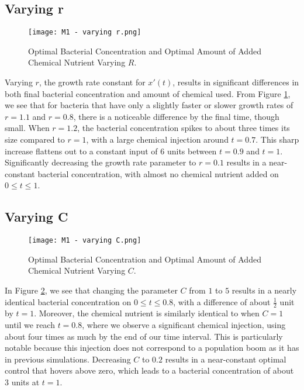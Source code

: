 \documentclass[10pt]{article}
\theoremstyle{exmp}
\begin{document}
\newpage 
\subsection{Varying r}

\begin{figure}[h!tbp]
    \centering
    \texttt{[image: M1 - varying r.png]}
    \caption{Optimal Bacterial Concentration and Optimal Amount of Added Chemical Nutrient Varying $R$.}
    \label{fig:r}
\end{figure}

\noindent Varying $r$, the growth rate constant for $x'(t)$, results in significant differences in both final bacterial concentration and amount of chemical used. From Figure \ref{fig:r}, we see that for bacteria that have only a slightly faster or slower growth rates of $r = 1.1$ and $r = 0.8$, there is a noticeable difference by the final time, though small. When $r = 1.2$, the bacterial concentration spikes to about three times its size compared to $r = 1$, with a large chemical injection around $t = 0.7$. This sharp increase flattens out to a constant input of $6$ units between $t = 0.9$ and $t = 1$. Significantly decreasing the growth rate parameter to $r = 0.1$ results in a near-constant bacterial concentration, with almost no chemical nutrient added on $0 \leq t \leq 1$. \\

\subsection{Varying C}

\begin{figure}
    \centering
    \texttt{[image: M1 - varying C.png]}
    \caption{Optimal Bacterial Concentration and Optimal Amount of Added Chemical Nutrient Varying $C$.}
    \label{fig:C}
\end{figure}

In Figure \ref{fig:C}, we see that changing the parameter $C$ from $1$ to $5$ results in a nearly identical bacterial concentration on $0 \leq t \leq 0.8$, with a difference of about $\frac{1}{2}$ unit by $t = 1$. Moreover, the chemical nutrient is similarly identical to when $C = 1$ until we reach $t = 0.8$, where we observe a significant chemical injection, using about four times as much by the end of our time interval. This is particularly notable because this injection does not correspond to a population boom as it has in previous simulations. Decreasing $C$ to $0.2$ results in a near-constant optimal control that hovers above zero, which leads to a bacterial concentration of about $3$ units at $t = 1$.
\end{document}
